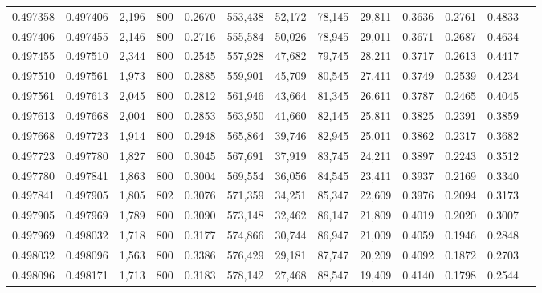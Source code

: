 \begin{tabular}{rrrrrrrrrrrrr}
0.497358 & 0.497406 &  2,196 & 800 &                                     0.2670 & 553,438 &  52,172 &  78,145 &  29,811 & 0.3636 & 0.2761 & 0.4833 \\
0.497406 & 0.497455 &  2,146 & 800 &                                     0.2716 & 555,584 &  50,026 &  78,945 &  29,011 & 0.3671 & 0.2687 & 0.4634 \\
0.497455 & 0.497510 &  2,344 & 800 &                                     0.2545 & 557,928 &  47,682 &  79,745 &  28,211 & 0.3717 & 0.2613 & 0.4417 \\
0.497510 & 0.497561 &  1,973 & 800 &                                     0.2885 & 559,901 &  45,709 &  80,545 &  27,411 & 0.3749 & 0.2539 & 0.4234 \\
0.497561 & 0.497613 &  2,045 & 800 &                                     0.2812 & 561,946 &  43,664 &  81,345 &  26,611 & 0.3787 & 0.2465 & 0.4045 \\
0.497613 & 0.497668 &  2,004 & 800 &                                     0.2853 & 563,950 &  41,660 &  82,145 &  25,811 & 0.3825 & 0.2391 & 0.3859 \\
0.497668 & 0.497723 &  1,914 & 800 &                                     0.2948 & 565,864 &  39,746 &  82,945 &  25,011 & 0.3862 & 0.2317 & 0.3682 \\
0.497723 & 0.497780 &  1,827 & 800 &                                     0.3045 & 567,691 &  37,919 &  83,745 &  24,211 & 0.3897 & 0.2243 & 0.3512 \\
0.497780 & 0.497841 &  1,863 & 800 &                                     0.3004 & 569,554 &  36,056 &  84,545 &  23,411 & 0.3937 & 0.2169 & 0.3340 \\
0.497841 & 0.497905 &  1,805 & 802 &                                     0.3076 & 571,359 &  34,251 &  85,347 &  22,609 & 0.3976 & 0.2094 & 0.3173 \\
0.497905 & 0.497969 &  1,789 & 800 &                                     0.3090 & 573,148 &  32,462 &  86,147 &  21,809 & 0.4019 & 0.2020 & 0.3007 \\
0.497969 & 0.498032 &  1,718 & 800 &                                     0.3177 & 574,866 &  30,744 &  86,947 &  21,009 & 0.4059 & 0.1946 & 0.2848 \\
0.498032 & 0.498096 &  1,563 & 800 &                                     0.3386 & 576,429 &  29,181 &  87,747 &  20,209 & 0.4092 & 0.1872 & 0.2703 \\
0.498096 & 0.498171 &  1,713 & 800 &                                     0.3183 & 578,142 &  27,468 &  88,547 &  19,409 & 0.4140 & 0.1798 & 0.2544 \\

\end{tabular}
